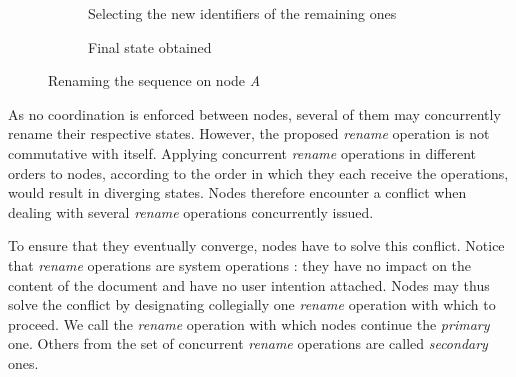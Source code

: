\documentclass[sigplan,10pt]{acmart}
\newcommand{\trm}[1]{\mathit{#1}}
\newcommand{\id}[3]{$\trm{#1}^{\trm{#2}}_{\trm{#3}}$}
\newcommand{\epoch}[1]{$\varepsilon_{#1}$}
\newcommand{\widthletter}{7mm}
\begin{document}
\begin{figure}[ht!]
\begin{subfigure}{\columnwidth}
            \caption{Selecting the new identifiers of the remaining ones}
        \label{fig:renaming-second-id}
    \end{subfigure}
    \begin{subfigure}{\columnwidth}
        \caption{Final state obtained}
        \label{fig:renaming-final-state}
    \end{subfigure}
    \caption{Renaming the sequence on node \emph{A}}
    \label{fig:renaming}
\end{figure}


As no coordination is enforced between nodes, several of them may concurrently rename their respective states.
However, the proposed \emph{rename} operation is not commutative with itself.
Applying concurrent \emph{rename} operations in different orders to nodes, according to the order in which they each receive the operations, would result in diverging states.
Nodes therefore encounter a conflict when dealing with several \emph{rename} operations concurrently issued.

To ensure that they eventually converge, nodes have to solve this conflict.
Notice that \emph{rename} operations are system operations : they have no impact on the content of the document and have no user intention attached.
Nodes may thus solve the conflict by designating collegially one \emph{rename} operation with which to proceed.
We call the \emph{rename} operation with which nodes continue the \emph{primary} one.
Others from the set of concurrent \emph{rename} operations are called \emph{secondary} ones.
\end{document}
